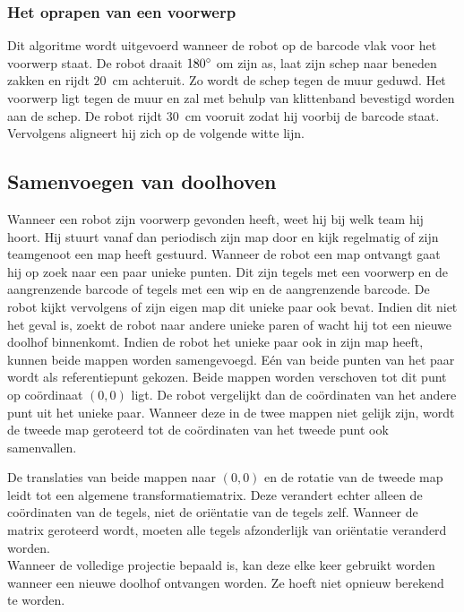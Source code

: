 \documentclass[tt3]{penoverslag}
\begin{document}
\subsubsection{Het oprapen van een voorwerp}
Dit algoritme wordt uitgevoerd wanneer de robot op de barcode vlak voor het voorwerp staat. De robot draait $180\degree$ om zijn as, laat zijn schep naar beneden zakken en rijdt $20$~cm achteruit. Zo wordt de schep tegen de muur geduwd. Het voorwerp ligt tegen de muur en zal met behulp van klittenband bevestigd worden aan de schep. De robot rijdt $30$~cm vooruit zodat hij voorbij de barcode staat. Vervolgens aligneert hij zich op de volgende witte lijn.

\subsection{Samenvoegen van doolhoven}
\label{ssec:AlgoMappen}
Wanneer een robot zijn voorwerp gevonden heeft, weet hij bij welk team hij hoort. Hij stuurt vanaf dan periodisch zijn map door en kijk regelmatig of zijn teamgenoot een map heeft gestuurd.
Wanneer de robot een map ontvangt gaat hij op zoek naar een paar unieke punten. Dit zijn tegels met een voorwerp en de aangrenzende barcode of tegels met een wip en de aangrenzende barcode. De robot kijkt vervolgens of zijn eigen map dit unieke paar ook bevat. Indien dit niet het geval is, zoekt de robot naar andere unieke paren of wacht hij tot een nieuwe doolhof binnenkomt.
Indien de robot het unieke paar ook in zijn map heeft, kunnen beide mappen worden samengevoegd. E\'en van beide punten van het paar wordt als referentiepunt gekozen. Beide mappen worden verschoven tot dit punt op co\"ordinaat $(0,0)$ ligt. De robot vergelijkt dan de co\"ordinaten van het andere punt uit het unieke paar. Wanneer deze in de twee mappen niet gelijk zijn, wordt de tweede map geroteerd tot de co\"ordinaten van het tweede punt ook samenvallen.

De translaties van beide mappen naar $(0,0)$ en de rotatie van de tweede map leidt tot een algemene transformatiematrix. Deze verandert echter alleen de co\"ordinaten van de tegels, niet de ori\"entatie van de tegels zelf. Wanneer de matrix geroteerd wordt, moeten alle tegels afzonderlijk van ori\"entatie veranderd worden.\\

Wanneer de volledige projectie bepaald is, kan deze elke keer gebruikt worden wanneer een nieuwe doolhof ontvangen worden. Ze hoeft niet opnieuw berekend te worden.
\end{document}
